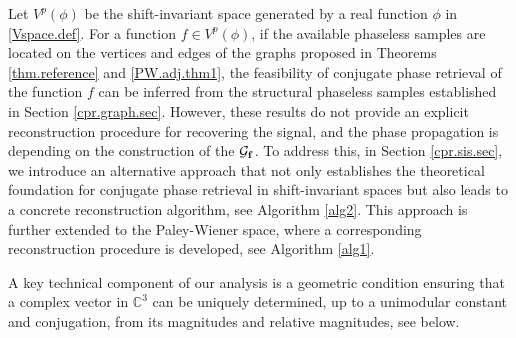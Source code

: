 \documentclass[12pt,oneside,reqno]{amsart}
\newcommand{\C}{\mathbb{C}}
\numberwithin{equation}{section}
\begin{document}
 Let $V^p(\phi)$ be the shift-invariant space generated by a real function $\phi$ in \eqref{Vspace.def}. For a function $f\in V^p(\phi)$, if the  available phaseless samples are located on the vertices and edges of the graphs proposed in Theorems \ref{thm.reference} and \ref{PW.adj.thm1}, the feasibility of conjugate phase retrieval of the function  $f$ can be inferred from the structural phaseless samples established in Section \ref{cpr.graph.sec}.  However, these results do not provide an explicit reconstruction procedure for recovering the signal, and the phase propagation is depending on the construction of the ${\mathcal G}_{\bf f}$. To address this, in Section \ref{cpr.sis.sec}, we introduce an alternative approach that not only establishes the theoretical foundation for conjugate phase retrieval in shift-invariant spaces but also leads to a concrete reconstruction algorithm, see Algorithm \ref{alg2}.  This approach is further extended to the Paley-Wiener space, where a corresponding reconstruction procedure is developed, see Algorithm \ref{alg1}.
%

	A key technical component of our analysis is a geometric condition ensuring that a complex vector in $\C^3$ can be uniquely determined, up to a unimodular constant and conjugation, from its magnitudes and relative magnitudes, see below.
	
	
	
\end{document}
